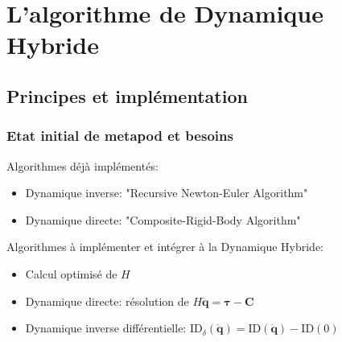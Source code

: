\documentclass[10pt]{beamer}
\begin{document}
\section{L'algorithme de Dynamique Hybride}

\subsection{Principes et implémentation}

\begin{frame}
  \frametitle{Etat initial de metapod et besoins}
 
  Algorithmes déjà implémentés:
  \begin{itemize}
  \item Dynamique inverse:	"Recursive Newton-Euler Algorithm"
  \item Dynamique directe:	"Composite-Rigid-Body Algorithm"
  \end{itemize}
  \bigskip
  Algorithmes à implémenter et intégrer à la Dynamique Hybride:
  \begin{itemize}
  \item Calcul optimisé de $H$
  \item Dynamique directe:	résolution de $H \boldsymbol{\ddot{q} = \tau - C}$
  \item Dynamique inverse différentielle: $\mathrm{ID}_{\delta}(\boldsymbol{\ddot{q}}) = \mathrm{ID}(\boldsymbol{\ddot{q}}) - \mathrm{ID}(0)$
  \end{itemize}
  
\end{frame}
\end{document}
